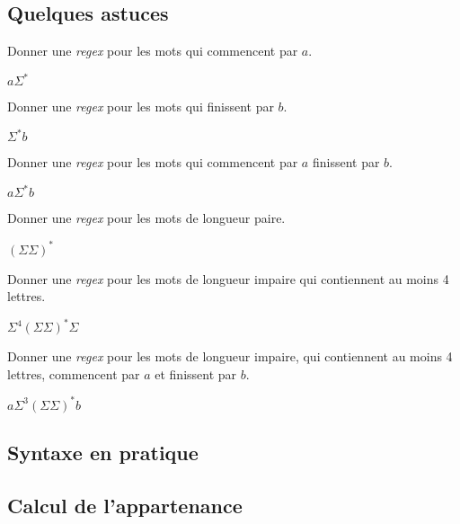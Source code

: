 \subsection{Quelques astuces}

\begin{exercice}
Donner une \textit{regex} pour les mots qui commencent par $a$.
\end{exercice}

\begin{correction*}
$a\Sigma^*$
\end{correction*}

\begin{exercice}
Donner une \textit{regex} pour les mots qui finissent par $b$.
\end{exercice}

\begin{correction*}
$\Sigma^*b$
\end{correction*}


\begin{exercice}
Donner une \textit{regex} pour les mots qui commencent par $a$ finissent par $b$.
\end{exercice}

\begin{correction*}
$a\Sigma^*b$
\end{correction*}


\begin{exercice}
Donner une \textit{regex} pour les mots de longueur paire.
\end{exercice}

\begin{correction*}
$(\Sigma\Sigma)^*$
\end{correction*}


\begin{exercice}
Donner une \textit{regex} pour les mots de longueur impaire qui contiennent au moins 4 lettres.
\end{exercice}

\begin{correction*}
$\Sigma^4(\Sigma\Sigma)^*\Sigma$
\end{correction*}


\begin{exercice}
Donner une \textit{regex} pour les mots de longueur impaire, qui contiennent au moins 4 lettres, commencent par $a$ et finissent par $b$.
\end{exercice}


\begin{correction*}
$a\Sigma^3(\Sigma\Sigma)^*b$
\end{correction*}

\subsection{Syntaxe en pratique}

\subsection{Calcul de l'appartenance}

